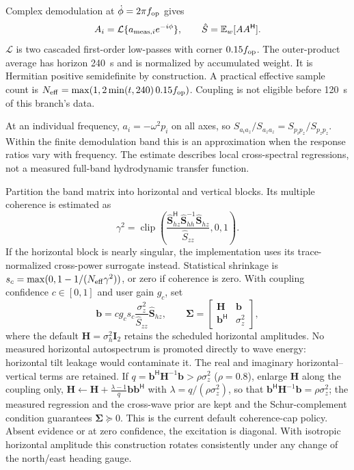 \documentclass[conference]{IEEEtran}
\newcommand{\vc}[1]{\bm{#1}}
\newcommand{\mt}[1]{\bm{#1}}
\newcommand{\E}{\mathbb E}
\newcommand{\herm}{^{\mathsf H}}
\DeclareMathOperator{\clip}{clip}
\begin{document}
Complex demodulation at $\dot\phi=2\pi f_{\rm op}$ gives
\begin{equation}
 A_i=\mathcal L\{a_{{\rm meas},i}e^{-i\phi}\},\qquad
 \hat{\mt S}=\E_w[\vc A\vc A\herm].
 \label{eq:demod}
\end{equation}
$\mathcal L$ is two cascaded first-order low-passes with corner
$0.15f_{\rm op}$. The outer-product average has horizon 240~s and is
normalized by accumulated weight. It is Hermitian positive semidefinite
by construction. A practical effective sample count is
$N_{\rm eff}=\max(1,2\min(t,240)\,0.15f_{\rm op})$.
Coupling is not eligible before 120~s of this branch's data.

At an individual frequency, $a_i=-\omega^2p_i$ on all axes, so
$S_{a_i a_z}/S_{a_z a_z}=S_{p_i p_z}/S_{p_zp_z}$.
Within the finite demodulation band this is an approximation when the
response ratios vary with frequency. The estimate describes local
cross-spectral regressions, not a measured full-band hydrodynamic transfer
function.

Partition the band matrix into horizontal and vertical blocks. Its
multiple coherence is estimated as
\begin{equation}
 \gamma^2=\clip\!\left(
 \frac{\hat{\vc S}_{hz}\herm\hat{\mt S}_{hh}^{-1}
                         \hat{\vc S}_{hz}}{\hat S_{zz}},0,1\right).
 \label{eq:coherence}
\end{equation}
If the horizontal block is nearly singular, the implementation uses its
trace-normalized cross-power surrogate instead. Statistical shrinkage is
$s_c=\max(0,1-1/(N_{\rm eff}\gamma^2))$, or zero if coherence is zero.
With coupling confidence $c\in[0,1]$ and user gain $g_c$, set
\begin{equation}
 \vc b=cg_cs_c\frac{\sigma_z^2}{\hat S_{zz}}\hat{\vc S}_{hz},\qquad
 \mt\Sigma=\begin{bmatrix}\mt H&\vc b\\\vc b\herm&\sigma_z^2\end{bmatrix},
 \label{eq:excitation}
\end{equation}
where the default $\mt H=\sigma_h^2\mt I_2$ retains the scheduled
horizontal amplitudes. No measured horizontal autospectrum is promoted
directly to wave energy: horizontal tilt leakage would contaminate it.
The real and imaginary horizontal--vertical terms are retained.
If $q=\vc b\herm\mt H^{-1}\vc b>\rho\sigma_z^2$ ($\rho=0.8$), enlarge
$\mt H$ along the coupling only,
$\mt H\leftarrow\mt H+\frac{\lambda-1}{q}\vc b\vc b\herm$ with
$\lambda=q/(\rho\sigma_z^2)$, so that $\vc b\herm\mt H^{-1}\vc b=\rho\sigma_z^2$;
the measured regression and the cross-wave prior are kept and the
Schur-complement condition guarantees $\mt\Sigma\succeq0$. This is the current default coherence-cap policy. Absent evidence or at zero confidence, the excitation
is diagonal. With isotropic horizontal amplitude this construction
rotates consistently under any change of the north/east heading gauge.
\end{document}

